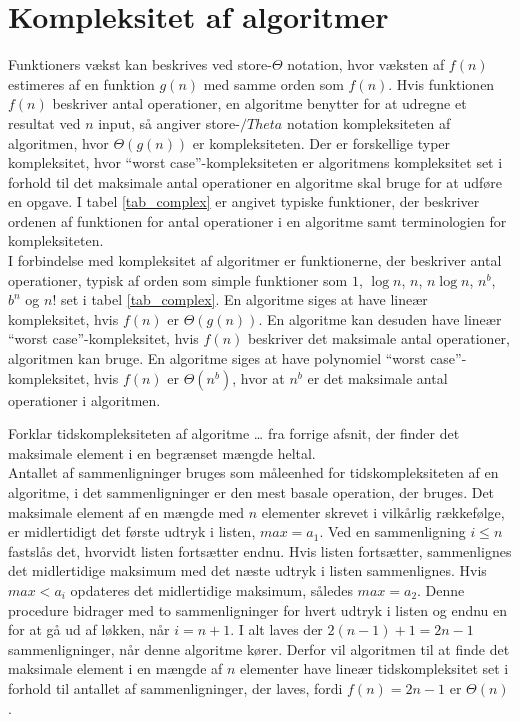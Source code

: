 \section{Kompleksitet af algoritmer}
Funktioners vækst kan beskrives ved store-$\Theta$ notation, hvor væksten af $f(n)$ estimeres af en funktion $g(n)$ med samme orden som $f(n)$. 
Hvis funktionen $f(n)$ beskriver antal operationer, en algoritme benytter for at udregne et resultat ved $n$ input, så angiver store-$/Theta$ notation kompleksiteten af algoritmen, hvor $\Theta(g(n))$ er kompleksiteten. 
Der er forskellige typer kompleksitet, hvor “worst case”-kompleksiteten er algoritmens kompleksitet set i forhold til det maksimale antal operationer en algoritme skal bruge for at udføre en opgave.
I tabel \ref{tab_complex} er angivet typiske funktioner, der beskriver  ordenen af funktionen for antal operationer i en algoritme samt terminologien for kompleksiteten.\\



I forbindelse med kompleksitet af algoritmer er funktionerne, der beskriver antal operationer, typisk af orden som simple funktioner som $1$, $\log n$, $n$, $n \log n$, $n^b$, $b^n$ og $n!$ set i tabel \ref{tab_complex}. 
En algoritme siges at have lineær kompleksitet, hvis $f(n)$ er $\Theta(g(n))$. 
En algoritme kan desuden have lineær “worst case”-kompleksitet, hvis $f(n)$ beskriver det maksimale antal operationer, algoritmen kan bruge. 
En algoritme siges at have polynomiel “worst case”-kompleksitet, hvis $f(n)$ er $\Theta(n^b)$, hvor at $n^b$ er det maksimale antal operationer i algoritmen.

\begin{exmp}
Forklar tidskompleksiteten af algoritme … fra forrige afsnit, der finder det maksimale element i en begrænset mængde heltal.\\ 
Antallet af sammenligninger bruges som måleenhed for tidskompleksiteten af en algoritme, i det sammenligninger er den mest basale operation, der bruges.
Det maksimale element af en mængde med $n$ elementer skrevet i vilkårlig rækkefølge, er midlertidigt det første udtryk i listen, $max=a_1$. 
Ved en sammenligning $i \leq n$ fastslås det, hvorvidt listen fortsætter endnu. Hvis listen fortsætter, sammenlignes det midlertidige maksimum med det næste udtryk i listen sammenlignes. 
Hvis $max<a_i$ opdateres det midlertidige maksimum, således $max=a_2$.
Denne procedure bidrager med to sammenligninger for hvert udtryk i listen og endnu en for at gå ud af løkken, når $i=n+1$. 
I alt laves der $2(n-1)+1=2n-1$ sammenligninger, når denne algoritme kører. 
Derfor vil algoritmen til at finde det maksimale element i en mængde af $n$ elementer have lineær tidskompleksitet set i forhold til antallet af sammenligninger, der laves, fordi $f(n)=2n-1$ er $\Theta (n)$.  
\end{exmp}

